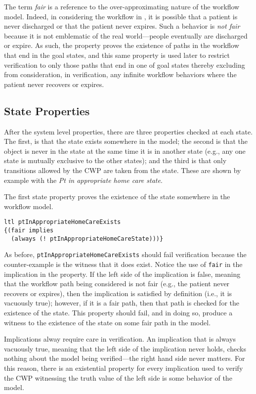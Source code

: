 The term \emph{fair} is a reference to the over-approximating nature of the workflow model. Indeed, in considering the workflow in , it is possible that a patient is never discharged or that the patient never expires. Such a behavior is \emph{not fair} because it is not emblematic of the real world---people eventually are discharged or expire. As such, the property proves the existence of paths in the workflow that end in the goal states, and this same property is used later to restrict verification to only those paths that end in one of goal states thereby excluding from consideration, in verification, any infinite workflow behaviors where the patient never recovers or expires.

\subsection{State Properties}
After the system level properties, there are three properties checked at each state. The first, is that the state exists somewhere in the model; the second is that the object is never in the state at the same time it is in another state (e.g., any one state is mutually exclusive to the other states); and the third is that only transitions allowed by the CWP are taken from the state. These are shown by example with the \emph{Pt in appropriate home care state}.

The first state property proves the existence of the state somewhere in the workflow model.
%
{\small
\begin{lstlisting}[style=myPromela]
ltl ptInAppropriateHomeCareExists 
{(fair implies 
  (always (! ptInAppropriateHomeCareState)))}
\end{lstlisting}
}
%
\noindent As before, \texttt{ptInAppropriateHomeCareExists} should fail verification because the counter-example is the witness that it does exist. Notice the use of \texttt{fair} in the implication in the property. If the left side of the implication is false, meaning that the workflow path being considered is not fair (e.g., the patient never recovers or expires), then the implication is satisfied by definition (i.e., it is vacuously true); however, if it is a fair path, then that path is checked for the existence of the state. This property should fail, and in doing so, produce a witness to the existence of the state on some fair path in the model.

Implications alway require care in verification. An implication that is always vacuously true, meaning that the left side of the implication never holds, checks nothing about the model being verified---the right hand side never matters. For this reason, there is an existential property for every implication used to verify the CWP witnessing the truth value of the left side is some behavior of the model.

